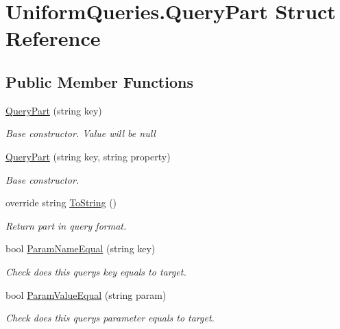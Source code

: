 \hypertarget{struct_uniform_queries_1_1_query_part}{}\section{Uniform\+Queries.\+Query\+Part Struct Reference}
\label{struct_uniform_queries_1_1_query_part}
\subsection*{Public Member Functions}
\begin{DoxyCompactItemize}
\item 
\mbox{\hyperlink{struct_uniform_queries_1_1_query_part_ae8a918635c52a837300ff3b1fdcdfd57}{Query\+Part}} (string key)
\begin{DoxyCompactList}\small\item\em Base constructor. Value will be null \end{DoxyCompactList}\item 
\mbox{\hyperlink{struct_uniform_queries_1_1_query_part_adabbcaa15ccf653f686d4f2bcd39ce09}{Query\+Part}} (string key, string property)
\begin{DoxyCompactList}\small\item\em Base constructor. \end{DoxyCompactList}\item 
override string \mbox{\hyperlink{struct_uniform_queries_1_1_query_part_acf5597530f693df3804fc2e638805245}{To\+String}} ()
\begin{DoxyCompactList}\small\item\em Return part in query format. \end{DoxyCompactList}\item 
bool \mbox{\hyperlink{struct_uniform_queries_1_1_query_part_af032469107805c1c71083666bb8548a9}{Param\+Name\+Equal}} (string key)
\begin{DoxyCompactList}\small\item\em Check does this query\textquotesingle{}s key equals to target. \end{DoxyCompactList}\item 
bool \mbox{\hyperlink{struct_uniform_queries_1_1_query_part_a5fb4475a72dcb6882fc860f7c0fcc50e}{Param\+Value\+Equal}} (string param)
\begin{DoxyCompactList}\small\item\em Check does this query\textquotesingle{}s parameter equals to target. \end{DoxyCompactList}\end{DoxyCompactItemize}
